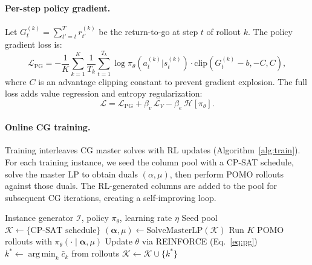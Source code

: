 \documentclass[11pt]{article}
\newcommand{\calK}{\mathcal{K}}
\DeclareMathOperator*{\argmin}{arg\,min}
\begin{document}
\paragraph{Per-step policy gradient.}
Let $G_t^{(k)} = \sum_{t'=t}^{T} r_{t'}^{(k)}$ be the return-to-go at step $t$ of rollout $k$.
The policy gradient loss is:
\begin{equation}\label{eq:pg}
    \mathcal{L}_{\text{PG}} = -\frac{1}{K} \sum_{k=1}^{K} \frac{1}{T_k} \sum_{t=1}^{T_k} \log \pi_\theta(a_t^{(k)} | s_t^{(k)}) \cdot \text{clip}(G_t^{(k)} - b, -C, C),
\end{equation}
where $C$ is an advantage clipping constant to prevent gradient explosion.
The full loss adds value regression and entropy regularization:
\begin{equation}
    \mathcal{L} = \mathcal{L}_{\text{PG}} + \beta_v \, \mathcal{L}_V - \beta_e \, \mathcal{H}[\pi_\theta].
\end{equation}

\paragraph{Online CG training.}
Training interleaves CG master solves with RL updates (Algorithm~\ref{alg:train}).
For each training instance, we seed the column pool with a CP-SAT schedule, solve the master LP to obtain duals $(\alpha, \mu)$, then perform POMO rollouts against those duals.
The RL-generated columns are added to the pool for subsequent CG iterations, creating a self-improving loop.

\begin{algorithm}[t]
\caption{Online CG Training}
\label{alg:train}
\begin{algorithmic}[1]
\REQUIRE Instance generator $\mathcal{I}$, policy $\pi_\theta$, learning rate $\eta$
        \STATE Seed pool $\calK \leftarrow \{\text{CP-SAT schedule}\}$
            \STATE $(\bm{\alpha}, \mu) \leftarrow \text{SolveMasterLP}(\calK)$
            \STATE Run $K$ POMO rollouts with $\pi_\theta(\cdot \mid \bm{\alpha}, \mu)$
            \STATE Update $\theta$ via REINFORCE (Eq.~\ref{eq:pg})
            \STATE $k^* \leftarrow \argmin_k \bar{c}_k$ from rollouts
                \STATE $\calK \leftarrow \calK \cup \{k^*\}$
            \ENDIF
        \ENDFOR
    \ENDFOR
\ENDFOR
\end{algorithmic}
\end{algorithm}
\end{document}
